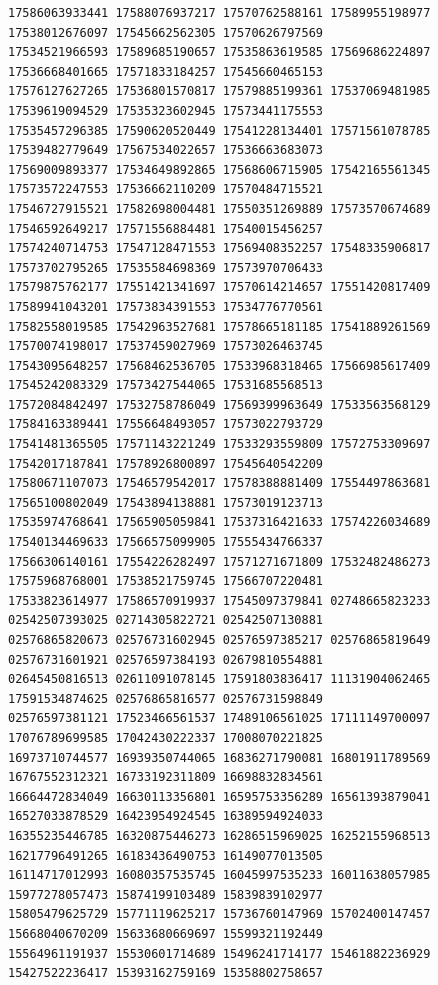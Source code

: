 \documentclass[9pt]{article}
\begin{document}
\begin{verbatim}
17586063933441 17588076937217 17570762588161 17589955198977 17538012676097 17545662562305 17570626797569
17534521966593 17589685190657 17535863619585 17569686224897 17536668401665 17571833184257 17545660465153
17576127627265 17536801570817 17579885199361 17537069481985 17539619094529 17535323602945 17573441175553
17535457296385 17590620520449 17541228134401 17571561078785 17539482779649 17567534022657 17536663683073
17569009893377 17534649892865 17568606715905 17542165561345 17573572247553 17536662110209 17570484715521
17546727915521 17582698004481 17550351269889 17573570674689 17546592649217 17571556884481 17540015456257
17574240714753 17547128471553 17569408352257 17548335906817 17573702795265 17535584698369 17573970706433
17579875762177 17551421341697 17570614214657 17551420817409 17589941043201 17573834391553 17534776770561
17582558019585 17542963527681 17578665181185 17541889261569 17570074198017 17537459027969 17573026463745
17543095648257 17568462536705 17533968318465 17566985617409 17545242083329 17573427544065 17531685568513
17572084842497 17532758786049 17569399963649 17533563568129 17584163389441 17556648493057 17573022793729
17541481365505 17571143221249 17533293559809 17572753309697 17542017187841 17578926800897 17545640542209
17580671107073 17546579542017 17578388881409 17554497863681 17565100802049 17543894138881 17573019123713
17535974768641 17565905059841 17537316421633 17574226034689 17540134469633 17566575099905 17555434766337
17566306140161 17554226282497 17571271671809 17532482486273 17575968768001 17538521759745 17566707220481
17533823614977 17586570919937 17545097379841 02748665823233 02542507393025 02714305822721 02542507130881
02576865820673 02576731602945 02576597385217 02576865819649 02576731601921 02576597384193 02679810554881
02645450816513 02611091078145 17591803836417 11131904062465 17591534874625 02576865816577 02576731598849
02576597381121 17523466561537 17489106561025 17111149700097 17076789699585 17042430222337 17008070221825
16973710744577 16939350744065 16836271790081 16801911789569 16767552312321 16733192311809 16698832834561
16664472834049 16630113356801 16595753356289 16561393879041 16527033878529 16423954924545 16389594924033
16355235446785 16320875446273 16286515969025 16252155968513 16217796491265 16183436490753 16149077013505
16114717012993 16080357535745 16045997535233 16011638057985 15977278057473 15874199103489 15839839102977
15805479625729 15771119625217 15736760147969 15702400147457 15668040670209 15633680669697 15599321192449
15564961191937 15530601714689 15496241714177 15461882236929 15427522236417 15393162759169 15358802758657

\end{verbatim}
\end{document}
